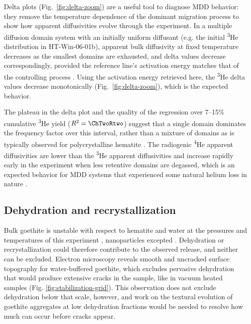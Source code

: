 Delta plots (Fig.~\ref{fig:delta-zoom}) are a useful tool to diagnose MDD behavior: they remove the temperature dependence of the dominant migration process to show how apparent diffusivities evolve through the experiment. In a multiple diffusion domain system with an initially uniform diffusant (e.g. the initial \textsuperscript{3}He distribution in HT-Win-06-01b), apparent bulk diffusivity at fixed temperature decreases as the smallest domains are exhausted, and delta values decrease correspondingly, provided the reference line's activation energy matches that of the controlling process \citep{lovera1991,farley2018}. Using the activation energy retrieved here, the \textsuperscript{3}He delta values decrease monotonically (Fig.~\ref{fig:delta-zoom}), which is the expected behavior.

The plateau in the delta plot and the quality of the regression over 7--15\% cumulative \textsuperscript{3}He yield ($R^{2} = \ChTwoRtwo$) suggest that a single domain dominates the frequency factor over this interval, rather than a mixture of domains as is typically observed for polycrystalline hematite \citep{farley2018}. The radiogenic \textsuperscript{4}He apparent diffusivities are lower than the \textsuperscript{3}He apparent diffusivities and increase rapidly early in the experiment when less retentive domains are degassed, which is an expected behavior for MDD systems that experienced some natural helium loss in nature \citep{shuster2004,shustervasconcelos2005}. 

\subsection{Dehydration and recrystallization}\label{sec:discussion-alteration}

Bulk goethite is unstable with respect to hematite and water at the pressures and temperatures of this experiment \citep{majzlan2003}, nanoparticles excepted \citep{guobarnard2011,navrotsky2008}. Dehydration or recrystallization could therefore contribute to the observed release, and neither can be excluded. Electron microscopy reveals smooth and uncracked surface topography for water-buffered goethite, which excludes pervasive dehydration that would produce extensive cracks in the sample, like in vacuum heated samples (Fig. \ref{fig:stabilization-grid}). This observation does not exclude dehydration below that scale, however, and work on the textural evolution of goethite aggregates at low dehydration fractions would be needed to resolve how much can occur before cracks appear.

